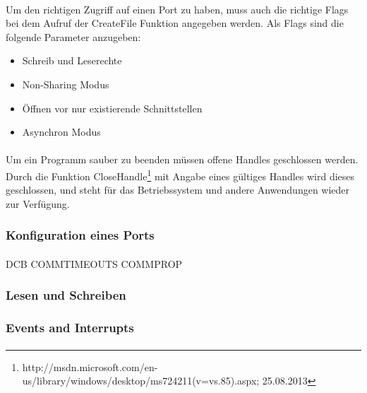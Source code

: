 \paragraph{}
Um den richtigen Zugriff auf einen Port zu haben, muss auch die richtige Flags bei dem Aufruf der CreateFile Funktion angegeben werden. Als Flags sind die folgende Parameter anzugeben:
\begin{itemize}
\item Schreib und Leserechte
\item Non-Sharing Modus
\item Öffnen vor nur existierende Schnittstellen
\item Asynchron Modus
\end{itemize}


\paragraph{}
Um ein Programm sauber zu beenden müssen offene Handles geschlossen werden. Durch die Funktion CloseHandle\footnote{http://msdn.microsoft.com/en-us/library/windows/desktop/ms724211(v=vs.85).aspx; 25.08.2013} mit Angabe eines gültiges Handles wird dieses geschlossen, und steht für das Betriebssystem und andere Anwendungen wieder zur Verfügung.

\subsubsection{Konfiguration eines Ports}
\paragraph{}

DCB
COMMTIMEOUTS
COMMPROP

\subsubsection{Lesen und Schreiben}
\paragraph{}

\subsubsection{Events and Interrupts}
\paragraph{}